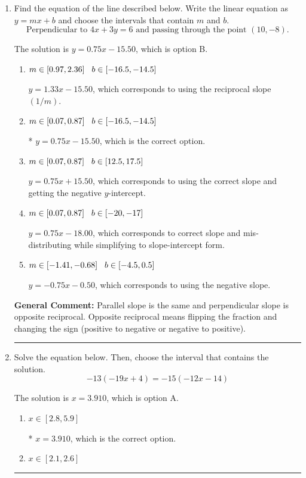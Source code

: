 \documentclass{extbook}[14pt]
\newcommand{\litem}[1]{\item #1

\rule{\textwidth}{0.4pt}}
\begin{document}
\begin{enumerate}\litem{
Find the equation of the line described below. Write the linear equation as $ y=mx+b $ and choose the intervals that contain $m$ and $b$.
\[ \text{Perpendicular to } 4 x + 3 y = 6 \text{ and passing through the point } (10, -8). \]

The solution is \( y = 0.75x - 15.50 \), which is option B.\begin{enumerate}[label=\Alph*.]
\item \( m \in [0.97, 2.36] \hspace*{3mm} b \in [-16.5, -14.5] \)

 $y = 1.33x - 15.50$, which corresponds to using the reciprocal slope $(1/m)$.
\item \( m \in [0.07, 0.87] \hspace*{3mm} b \in [-16.5, -14.5] \)

* $y = 0.75x - 15.50$, which is the correct option.
\item \( m \in [0.07, 0.87] \hspace*{3mm} b \in [12.5, 17.5] \)

 $y = 0.75x + 15.50$, which corresponds to using the correct slope and getting the negative $y$-intercept.
\item \( m \in [0.07, 0.87] \hspace*{3mm} b \in [-20, -17] \)

 $y = 0.75x - 18.00$, which corresponds to correct slope and mis-distributing while simplifying to slope-intercept form.
\item \( m \in [-1.41, -0.68] \hspace*{3mm} b \in [-4.5, 0.5] \)

 $y = -0.75x - 0.50$, which corresponds to using the negative slope.
\end{enumerate}

\textbf{General Comment:} Parallel slope is the same and perpendicular slope is opposite reciprocal. Opposite reciprocal means flipping the fraction and changing the sign (positive to negative or negative to positive).
}
\litem{
Solve the equation below. Then, choose the interval that contains the solution.
\[ -13(-19x + 4) = -15(-12x -14) \]

The solution is \( x = 3.910 \), which is option A.\begin{enumerate}[label=\Alph*.]
\item \( x \in [2.8, 5.9] \)

* $x = 3.910$, which is the correct option.
\item \( x \in [2.1, 2.6] \)


\end{enumerate}}
\end{enumerate}
\end{document}

